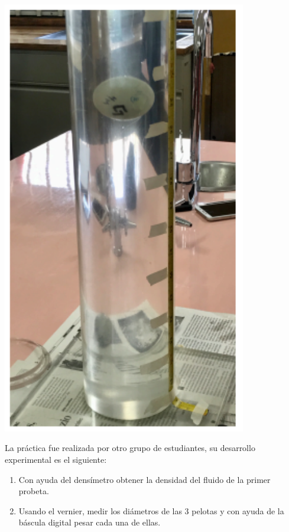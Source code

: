 \documentclass[DIV=calc, paper=a4, fontsize=11pt]{scrartcl}
\newenvironment{Figura}
  {\par\medskip\noindent\minipage{\linewidth}}
  {\endminipage\par\medskip}
\begin{document}
\begin{multicols}{2}
\begin{Figura}
\centering
    \includegraphics[width=0.8\textwidth]{viscosidad 2.PNG}
    \label{fig}
\end{Figura}

La práctica fue realizada por otro grupo de estudiantes, su desarrollo experimental es el siguiente:

\begin{enumerate}

    \item Con ayuda del densímetro obtener la densidad del fluido de la primer probeta.

    \item Usando el vernier, medir los diámetros de las 3 pelotas y con ayuda de la báscula digital pesar cada una de ellas.
    

\end{enumerate}
\end{multicols}
\end{document}
